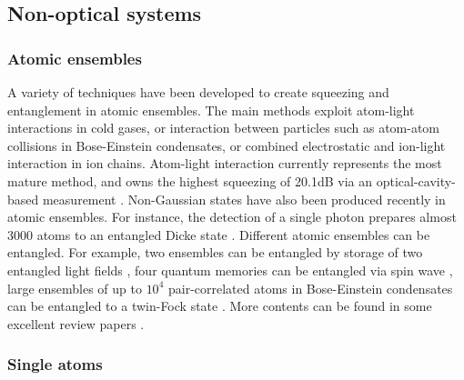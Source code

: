 \documentclass[aps,rmp,twocolumn,amsmath,amssymb,nofootinbib,superscriptaddress,longbibliography,floatfix,table-of-contents,eqsecnum]{revtex4-1}
\begin{document}
%
%

\subsection{Non-optical systems} 

%
%

\subsubsection{Atomic ensembles} 

A variety of techniques have been developed to create squeezing and entanglement in atomic ensembles. The main methods exploit atom-light interactions in cold gases, or interaction between particles such as atom-atom collisions in Bose-Einstein condensates, or combined electrostatic and ion-light interaction in ion chains. Atom-light interaction currently represents the most mature method, and owns the highest squeezing of 20.1dB via an optical-cavity-based measurement \cite{hosten2016measurement}. Non-Gaussian states have also been produced recently in atomic ensembles. For instance, the detection of a single photon prepares almost 3000 atoms to an entangled Dicke state \cite{mcconnell2015entanglement}. Different atomic ensembles can be entangled. For example, two ensembles can be entangled by storage of two entangled light fields \cite{lukin2000entanglement}, four quantum memories can be entangled via spin wave \cite{choi2010entanglement}, large ensembles of up to $10^4$ pair-correlated atoms in Bose-Einstein condensates can be entangled to a twin-Fock state \cite{lucke2011twin}. More contents can be found in some excellent review papers \cite{kimble2008quantum, hammerer2010quantum, sangouard2011quantum, pezze2016non}.

%
%

\subsubsection{Single atoms} 
\end{document}
